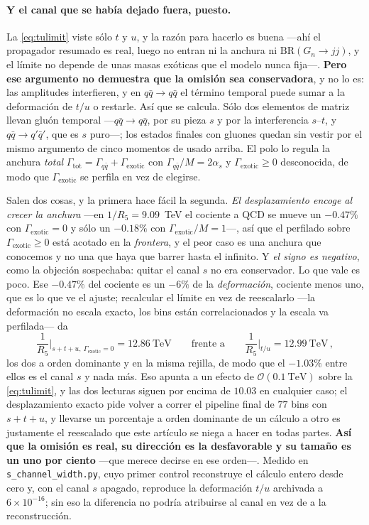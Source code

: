 \documentclass[11pt,a4paper]{article}
\begin{document}
\paragraph{Y el canal que se había dejado fuera, puesto.} La \eqref{eq:tulimit} viste sólo $t$ y
$u$, y la razón para hacerlo es buena ---ahí el propagador resumado es real, luego no entran ni la
anchura ni $\mathrm{BR}(G_n\to jj)$, y el límite no depende de unas masas exóticas que el modelo
nunca fija---. \textbf{Pero ese argumento no demuestra que la omisión sea conservadora}, y no lo
es: las amplitudes interfieren, y en $q\bar q\to q\bar q$ el término temporal puede sumar a la
deformación de $t/u$ o restarle. Así que se calcula. Sólo dos elementos de matriz llevan gluón
temporal ---$q\bar q\to q\bar q$, por su pieza $s$ y por la interferencia $s$--$t$, y
$q\bar q\to q'\bar q'$, que es $s$ puro---; los estados finales con gluones quedan sin vestir por
el mismo argumento de cinco momentos de \cite{DMN01} usado arriba. El polo lo regula la anchura
\emph{total} $\Gamma_{\mathrm{tot}}=\Gamma_{q\bar q}+\Gamma_{\mathrm{exotic}}$ con
$\Gamma_{q\bar q}/M=2\alpha_s$ y $\Gamma_{\mathrm{exotic}}\ge0$ desconocida, de modo que
$\Gamma_{\mathrm{exotic}}$ se perfila en vez de elegirse.

\noindent Salen dos cosas, y la primera hace fácil la segunda. \emph{El desplazamiento encoge al
crecer la anchura} ---en $1/R_5=9.09$~TeV el cociente a QCD se mueve un $-0.47\%$ con
$\Gamma_{\mathrm{exotic}}=0$ y sólo un $-0.18\%$ con $\Gamma_{\mathrm{exotic}}/M=1$---, así que el
perfilado sobre $\Gamma_{\mathrm{exotic}}\ge0$ está acotado en la \emph{frontera}, y el peor caso
es una anchura que conocemos y no una que haya que barrer hasta el infinito. Y \emph{el signo es
negativo}, como la objeción sospechaba: quitar el canal $s$ no era conservador. Lo que vale es
poco. Ese $-0.47\%$ del cociente es un $-6\%$ de la \emph{deformación}, cociente menos uno, que es
lo que ve el ajuste; recalcular el límite en vez de reescalarlo ---la deformación no escala exacto,
los bins están correlacionados y la escala va perfilada--- da
\begin{equation}\label{eq:stu}
  \frac{1}{R_5}\Big|_{s+t+u,\ \Gamma_{\mathrm{exotic}}=0}=12.86\ \text{TeV}
  \qquad\text{frente a}\qquad
  \frac{1}{R_5}\Big|_{t/u}=12.99\ \text{TeV}\,,
\end{equation}
los dos a orden dominante y en la misma rejilla, de modo que el $-1.03\%$ entre ellos es el canal
$s$ y nada más. Eso apunta a un efecto de $\mathcal{O}(0.1~\text{TeV})$ sobre la
\eqref{eq:tulimit}, y las dos lecturas siguen por encima de $10.03$ en cualquier caso; el
desplazamiento exacto pide volver a correr el pipeline final de $77$ bins con $s+t+u$, y llevarse
un porcentaje a orden dominante de un cálculo a otro es justamente el reescalado que este artículo
se niega a hacer en todas partes. \textbf{Así que la omisión es real, su dirección es la desfavorable y su tamaño es un
uno por ciento} ---que merece decirse en ese orden---. Medido en
\texttt{s\_\allowbreak channel\_\allowbreak width.py}, cuyo primer control reconstruye el cálculo
entero desde cero y, con el canal $s$ apagado, reproduce la deformación $t/u$ archivada a
$6\times10^{-16}$; sin eso la diferencia no podría atribuirse al canal en vez de a la
reconstrucción.
\end{document}
